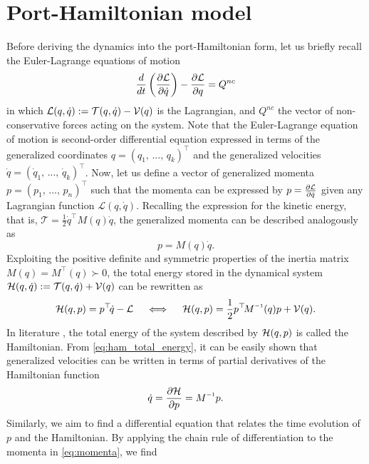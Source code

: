 \clearpage
\section{Port-Hamiltonian model}
Before deriving the dynamics into the port-Hamiltonian form, let us briefly recall the Euler-Lagrange equations of motion 
\begin{equation}
\frac{d}{dt} \left( \frac{\partial \mathcal{L}}{ \partial \dot{q}} \right) - \frac{\partial \mathcal{L}}{\partial q} = Q^{nc}
\end{equation}
in which $\mathcal{L}(q,\dot{q}) := \mathcal{T}(q,\dot{q}) - \mathcal{V}(q)$ is the Lagrangian, and $Q^{nc}$ the vector of non-conservative forces acting on the system. Note that the Euler-Lagrange equation of motion is second-order differential equation expressed in terms of the generalized coordinates $q = (q_1,\,...,\,q_k)^\top$ and the generalized velocities $\dot{q} = (\dot{q}_1,\,...,\,\dot{q}_k)^\top$. Now, let us define a vector of generalized momenta $p = (p_1,\,...,\,p_n)^\top$ such that the momenta can be expressed by $p = \frac{\partial \mathcal{L}}{\partial \dot{q}}$ given any Lagrangian function $\mathcal{L}(q,\dot{q})$. Recalling the expression for the kinetic energy, that is, $\mathcal{T} = \frac{1}{2}\dot{q}^\top M(q) \dot{q}$, the generalized momenta can be described analogously as
%
\begin{equation}
p = M(q) \dot{q}. \label{eq:momenta}
\end{equation}
%
Exploiting the positive definite and symmetric properties of the inertia matrix $M(q) = M^\top(q) \succ 0$, the total energy stored in the dynamical system $\mathcal{H}(q,\dot{q})  := \mathcal{T}(q,\dot{q}) + \mathcal{V}(q)$ can be rewritten as
\begin{equation}
\Hm (q,p) = p^\top \!\dot{q} - \La \quad \iff  \quad \Hm (q,p) = \frac{1}{2}p^\top \! M\inv(q)p + \V(q). \label{eq:ham_total_energy}
\end{equation}
In literature \cite{Schaft2004,Spong1996,Ortega2002}, the total energy of the system described by $\mathcal{H} (q,p)$ is called the Hamiltonian. From \eqref{eq:ham_total_energy}, it can be easily shown that generalized velocities can be written in terms of partial derivatives of the Hamiltonian function
%
\begin{equation}
\dot{q} = \frac{\p \Hm}{\p p} = M\inv p.
\end{equation}
%
Similarly, we aim to find a differential equation that relates the time evolution of ${p}$ and the Hamiltonian. By applying the chain rule of differentiation to the momenta in \eqref{eq:momenta}, we find
